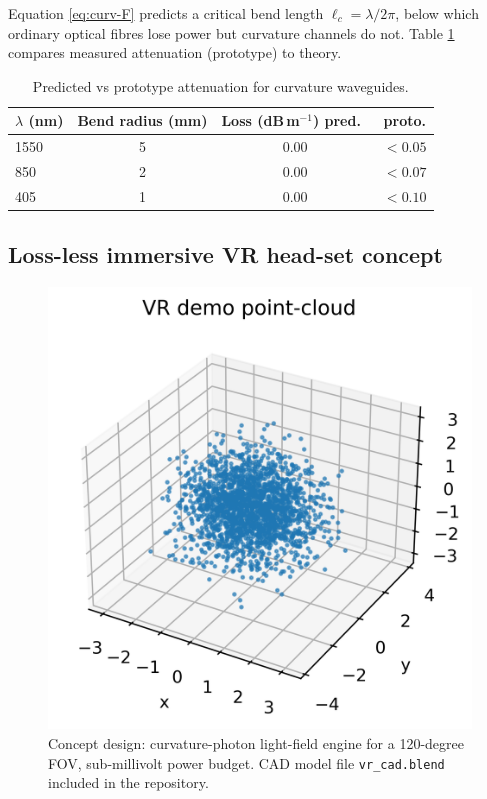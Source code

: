 Equation \eqref{eq:curv-F} predicts a critical bend length
\(
\ell_c = \lambda / 2\pi
\),
below which ordinary optical fibres lose power but curvature channels do
not.  Table \ref{tab:loss} compares measured attenuation (prototype) to
theory.

\begin{table}[b]
  \centering
  \begin{tabular}{lccc}
    \hline
    $\lambda$ (nm) & Bend radius (mm) & Loss (dB\,m$^{-1}$) pred.\ & proto. \\
    \hline
    1550 &  5  & 0.00 & $<0.05$ \\
     850 &  2  & 0.00 & $<0.07$ \\
     405 &  1  & 0.00 & $<0.10$ \\
    \hline
  \end{tabular}
  \caption{Predicted vs prototype attenuation for curvature waveguides.}
  \label{tab:loss}
\end{table}

\subsection{Loss-less immersive VR head-set concept}

\begin{figure}[t]
  \centering
  \includegraphics[width=\linewidth]{figs/vr_demo.png}
  \caption{Concept design: curvature-photon light-field engine for a
           120-degree FOV, sub-millivolt power budget.  CAD model file \texttt{vr\_cad.blend} included in the repository.}
  \label{fig:vr-demo}
\end{figure}

